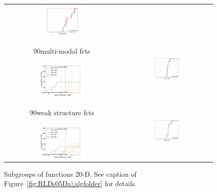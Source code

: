 \documentclass{article}
\newcommand{\rot}[2][2.5]{
  \hspace*{-3.5\baselineskip}%
  \begin{rotate}{90}\hspace{#1em}#2
  \end{rotate}}
\begin{document}
\begin{figure}[htbp!]
\begin{tabular}{@{}c@{}c@{}}
\includegraphics[width=0.3579\textwidth,trim=24mm 7.5mm 16mm 11mm, clip]{ppfvdistr_20D_hcond}
\\[-1ex]
\rot[1.7]{multi-modal fcts}
\includegraphics[width=0.41\textwidth,trim=0 7.5mm 16mm 11mm, clip]{pprldistr_20D_multi} &
\includegraphics[width=0.3579\textwidth,trim=24mm 7.5mm 16mm 11mm, clip]{ppfvdistr_20D_multi}
\\[-1ex]
\rot[1.5]{weak structure fcts}
\includegraphics[width=0.41\textwidth,trim=0 0mm 16mm 11mm, clip]{pprldistr_20D_mult2} &
\includegraphics[width=0.3579\textwidth,trim=24mm 0mm 16mm 11mm, clip]{ppfvdistr_20D_mult2}
\end{tabular}
\vspace*{-0.5ex}
\caption{\label{fig:RLDs20Db\algfolder}Subgroups of functions 20-D. See caption
of Figure~\ref{fig:RLDs05Da\algfolder} for details.}
\end{figure}
\end{document}
